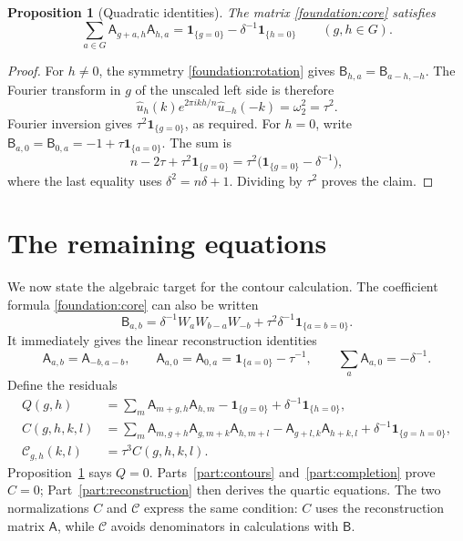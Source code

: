 \documentclass[11pt]{article}
\numberwithin{equation}{section}
\newtheorem{proposition}[theorem]{Proposition}
\theoremstyle{definition}
\theoremstyle{remark}
\newcommand{\ind}[1]{\mathbf1_{\{#1\}}}
\begin{document}
\begin{proposition}[Quadratic identities]\label{foundation:quadratics}
The matrix \eqref{foundation:core} satisfies
\begin{equation}\label{foundation:Q}
 \sum_{a\in G}\mathsf A_{g+a,h}\mathsf A_{h,a}
 =\ind{g=0}-\delta^{-1}\ind{h=0}
 \qquad(g,h\in G).
\end{equation}
\end{proposition}

\begin{proof}
For $h\ne0$, the symmetry \eqref{foundation:rotation} gives
$\mathsf B_{h,a}=\mathsf B_{a-h,-h}$.
The Fourier transform in $g$ of the unscaled left side is therefore
\[
 \widehat u_h(k)e^{2\pi ikh/n}
 \widehat u_{-h}(-k)=\omega_2^2=\tau^2.
\]
Fourier inversion gives $\tau^2\ind{g=0}$, as required.
For $h=0$, write $\mathsf B_{a,0}=\mathsf B_{0,a}
=-1+\tau\ind{a=0}$. The sum is
\[
 n-2\tau+\tau^2\ind{g=0}
 =\tau^2\bigl(\ind{g=0}-\delta^{-1}\bigr),
\]
where the last equality uses $\delta^2=n\delta+1$.
Dividing by $\tau^2$ proves the claim.
\end{proof}

\section{The remaining equations}
\label{sec:targets}

We now state the algebraic target for the contour calculation.
The coefficient formula \eqref{foundation:core} can also be written
\begin{equation}\label{tail:uniform-core}
 \mathsf B_{a,b}=\delta^{-1}W_aW_{b-a}W_{-b}
                  +\tau^2\delta^{-1}\ind{a=b=0}.
\end{equation}
It immediately gives the linear reconstruction identities
\begin{equation}\label{tail:linear}
 \mathsf A_{a,b}=\mathsf A_{-b,a-b},\qquad
 \mathsf A_{a,0}=\mathsf A_{0,a}=\ind{a=0}-\tau^{-1},
 \qquad \sum_a\mathsf A_{a,0}=-\delta^{-1}.
\end{equation}
Define the residuals
\begin{align}
 Q(g,h)&=\sum_m\mathsf A_{m+g,h}\mathsf A_{h,m}
                  -\ind{g=0}+\delta^{-1}\ind{h=0},\label{tail:Q}\\
 C(g,h,k,l)&=\sum_m\mathsf A_{m,g+h}\mathsf A_{g,m+k}
                         \mathsf A_{h,m+l}
       -\mathsf A_{g+l,k}\mathsf A_{h+k,l}
       +\delta^{-1}\ind{g=h=0},\label{tail:C}\\
 \mathcal C_{g,h}(k,l)&=\tau^3C(g,h,k,l).\label{tail:scaledC}
\end{align}
Proposition~\ref{foundation:quadratics} says $Q=0$.
Parts~\ref{part:contours} and~\ref{part:completion} prove $C=0$;
Part~\ref{part:reconstruction} then derives the quartic equations.
The two normalizations $C$ and $\mathcal C$ express the same condition:
$C$ uses the reconstruction matrix $\mathsf A$, while $\mathcal C$
avoids denominators in calculations with $\mathsf B$.
\end{document}
